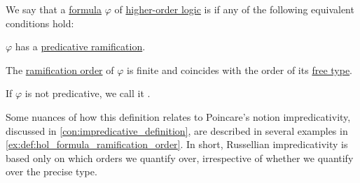 \begin{definition}\label{def:hol_formula_predicativity}\mimprovised
  We say that a \hyperref[def:hol_expression/formula]{formula} \( \varphi \) of \hyperref[def:higher_order_logic]{higher-order logic} is  if any of the following equivalent conditions hold:
  \begin{thmenum}
     \( \varphi \) has a \hyperref[def:ramified_theory_of_types/predicativity]{predicative ramification}.

     The \hyperref[def:hol_formula_ramification_order]{ramification order} of \( \varphi \) is finite and coincides with the order of its \hyperref[def:hol_formula_free_type]{free type}.
  \end{thmenum}

  If \( \varphi \) is not predicative, we call it .
\end{definition}
\begin{comments}
  \item Some nuances of how this definition relates to Poincare's notion impredicativity, discussed in \cref{con:impredicative_definition}, are described in several examples in \cref{ex:def:hol_formula_ramification_order}. In short, Russellian impredicativity is based only on which orders we quantify over, irrespective of whether we quantify over the precise type.
\end{comments}
